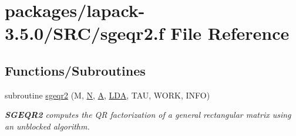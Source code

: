 \hypertarget{sgeqr2_8f}{}\section{packages/lapack-\/3.5.0/\+S\+R\+C/sgeqr2.f File Reference}
\label{sgeqr2_8f}
\subsection*{Functions/\+Subroutines}
\begin{DoxyCompactItemize}
\item 
subroutine \hyperlink{group__realGEcomputational_gacd1ae8241f3d12cfa0f1d5ecdbc32eca}{sgeqr2} (M, \hyperlink{polmisc_8c_a0240ac851181b84ac374872dc5434ee4}{N}, \hyperlink{classA}{A}, \hyperlink{example__user_8c_ae946da542ce0db94dced19b2ecefd1aa}{L\+D\+A}, T\+A\+U, W\+O\+R\+K, I\+N\+F\+O)
\begin{DoxyCompactList}\small\item\em {\bfseries S\+G\+E\+Q\+R2} computes the Q\+R factorization of a general rectangular matrix using an unblocked algorithm. \end{DoxyCompactList}\end{DoxyCompactItemize}
